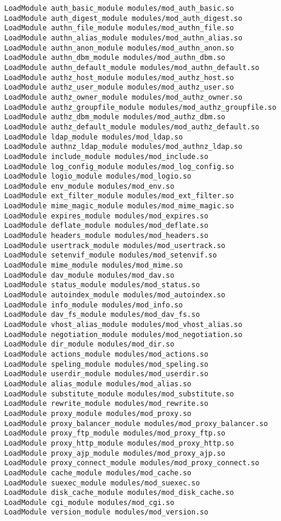 \begin{code}
\begin{lstlisting}
LoadModule auth_basic_module modules/mod_auth_basic.so
LoadModule auth_digest_module modules/mod_auth_digest.so
LoadModule authn_file_module modules/mod_authn_file.so
LoadModule authn_alias_module modules/mod_authn_alias.so
LoadModule authn_anon_module modules/mod_authn_anon.so
LoadModule authn_dbm_module modules/mod_authn_dbm.so
LoadModule authn_default_module modules/mod_authn_default.so
LoadModule authz_host_module modules/mod_authz_host.so
LoadModule authz_user_module modules/mod_authz_user.so
LoadModule authz_owner_module modules/mod_authz_owner.so
LoadModule authz_groupfile_module modules/mod_authz_groupfile.so
LoadModule authz_dbm_module modules/mod_authz_dbm.so
LoadModule authz_default_module modules/mod_authz_default.so
LoadModule ldap_module modules/mod_ldap.so
LoadModule authnz_ldap_module modules/mod_authnz_ldap.so
LoadModule include_module modules/mod_include.so
LoadModule log_config_module modules/mod_log_config.so
LoadModule logio_module modules/mod_logio.so
LoadModule env_module modules/mod_env.so
LoadModule ext_filter_module modules/mod_ext_filter.so
LoadModule mime_magic_module modules/mod_mime_magic.so
LoadModule expires_module modules/mod_expires.so
LoadModule deflate_module modules/mod_deflate.so
LoadModule headers_module modules/mod_headers.so
LoadModule usertrack_module modules/mod_usertrack.so
LoadModule setenvif_module modules/mod_setenvif.so
LoadModule mime_module modules/mod_mime.so
LoadModule dav_module modules/mod_dav.so
LoadModule status_module modules/mod_status.so
LoadModule autoindex_module modules/mod_autoindex.so
LoadModule info_module modules/mod_info.so
LoadModule dav_fs_module modules/mod_dav_fs.so
LoadModule vhost_alias_module modules/mod_vhost_alias.so
LoadModule negotiation_module modules/mod_negotiation.so
LoadModule dir_module modules/mod_dir.so
LoadModule actions_module modules/mod_actions.so
LoadModule speling_module modules/mod_speling.so
LoadModule userdir_module modules/mod_userdir.so
LoadModule alias_module modules/mod_alias.so
LoadModule substitute_module modules/mod_substitute.so
LoadModule rewrite_module modules/mod_rewrite.so
LoadModule proxy_module modules/mod_proxy.so
LoadModule proxy_balancer_module modules/mod_proxy_balancer.so
LoadModule proxy_ftp_module modules/mod_proxy_ftp.so
LoadModule proxy_http_module modules/mod_proxy_http.so
LoadModule proxy_ajp_module modules/mod_proxy_ajp.so
LoadModule proxy_connect_module modules/mod_proxy_connect.so
LoadModule cache_module modules/mod_cache.so
LoadModule suexec_module modules/mod_suexec.so
LoadModule disk_cache_module modules/mod_disk_cache.so
LoadModule cgi_module modules/mod_cgi.so
LoadModule version_module modules/mod_version.so


\end{lstlisting}
\end{code}
